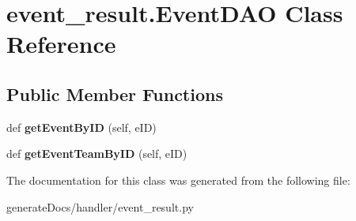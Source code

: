 \hypertarget{classevent__result_1_1_event_d_a_o}{}\section{event\+\_\+result.\+Event\+D\+AO Class Reference}
\label{classevent__result_1_1_event_d_a_o}
\subsection*{Public Member Functions}
\begin{DoxyCompactItemize}
\item 
\mbox{\label{classevent__result_1_1_event_d_a_o_af50c8861895eef36b27fca7a0eb74ebb}} 
def {\bfseries get\+Event\+By\+ID} (self, e\+ID)
\item 
\mbox{\label{classevent__result_1_1_event_d_a_o_a63caa60993756ebcd1e569354a6bd374}} 
def {\bfseries get\+Event\+Team\+By\+ID} (self, e\+ID)
\end{DoxyCompactItemize}


The documentation for this class was generated from the following file\+:\begin{DoxyCompactItemize}
\item 
generate\+Docs/handler/event\+\_\+result.\+py\end{DoxyCompactItemize}
